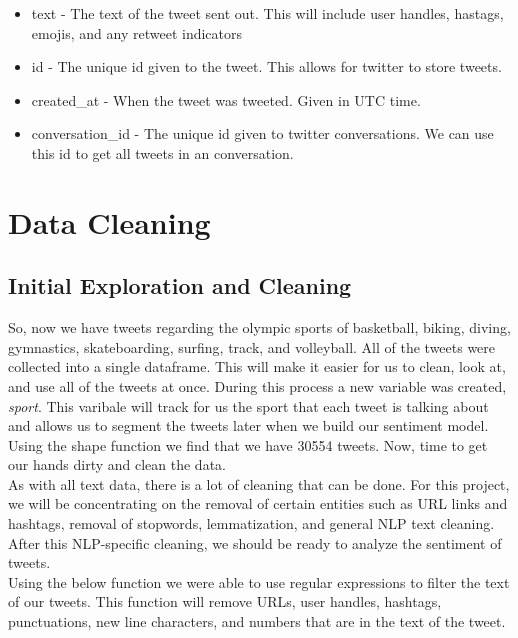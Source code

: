 \documentclass[12pt]{article}
\begin{document}
        \begin{itemize}
            \item text - The text of the tweet sent out. This will include user handles, hastags, emojis, and any retweet indicators
            \item id - The unique id given to the tweet. This allows for twitter to store tweets.
            \item created\_at - When the tweet was tweeted. Given in UTC time.
            \item conversation\_id - The unique id given to twitter conversations. We can use this id to get all tweets in an conversation.
        \end{itemize}
    \section{Data Cleaning}
        \subsection{Initial Exploration and Cleaning}
            So, now we have tweets regarding the olympic sports of basketball, biking, diving, gymnastics, skateboarding, surfing, track, and volleyball. All of the tweets were collected
            into a single dataframe. This will make it easier for us to clean, look at, and use all of the tweets at once. During this process a new variable was created,
            \textit{sport}. This varibale will track for us the sport that each tweet is talking about and allows us to segment the tweets later when we build our sentiment model. \\
        
            Using the shape function we find that we have 30554 tweets. Now, time to get our hands dirty and clean the data. \\
        
            As with all text data, there is a lot of cleaning that can be done. For this project, we will be concentrating on the removal of certain entities such as URL links and
            hashtags, removal of stopwords, lemmatization, and general NLP text cleaning. After this NLP-specific cleaning, we should be ready to analyze the sentiment of tweets. \\

            Using the below function we were able to use regular expressions to filter the text of our tweets. This function will remove URLs, user handles, hashtags, punctuations, new
            line characters, and numbers that are in the text of the tweet. \\
\end{document}
